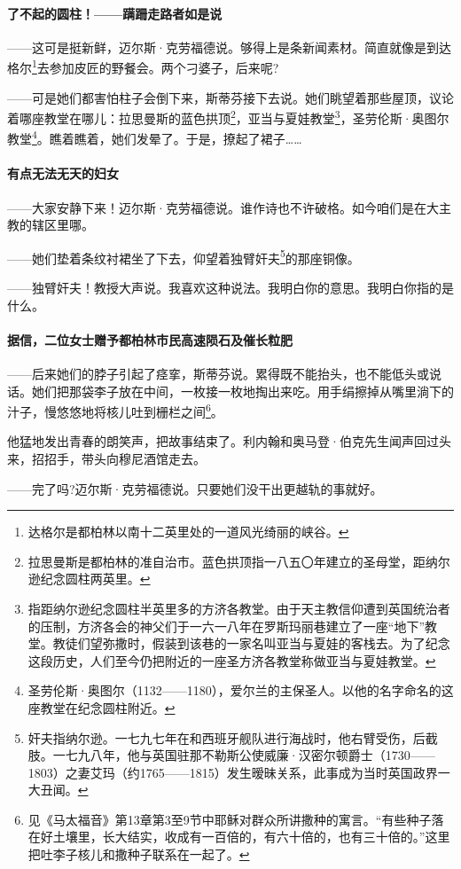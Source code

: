 \paragraph*{了不起的圆柱！——蹒跚走路者如是说}
\par ——这可是挺新鲜，迈尔斯·克劳福德说。够得上是条新闻素材。简直就像是到达格尔\footnote{达格尔是都柏林以南十二英里处的一道风光绮丽的峡谷。}去参加皮匠的野餐会。两个刁婆子，后来呢?
\par ——可是她们都害怕柱子会倒下来，斯蒂芬接下去说。她们眺望着那些屋顶，议论着哪座教堂在哪儿：拉思曼斯的蓝色拱顶\footnote{拉思曼斯是都柏林的准自治市。蓝色拱顶指一八五〇年建立的圣母堂，距纳尔逊纪念圆柱两英里。}，亚当与夏娃教堂\footnote{指距纳尔逊纪念圆柱半英里多的方济各教堂。由于天主教信仰遭到英国统治者的压制，方济各会的神父们于一六一八年在罗斯玛丽巷建立了一座“地下”教堂。教徒们望弥撒时，假装到该巷的一家名叫亚当与夏娃的客栈去。为了纪念这段历史，人们至今仍把附近的一座圣方济各教堂称做亚当与夏娃教堂。}，圣劳伦斯·奥图尔教堂\footnote{圣劳伦斯·奥图尔（1132——1180），爱尔兰的主保圣人。以他的名字命名的这座教堂在纪念圆柱附近。}。瞧着瞧着，她们发晕了。于是，撩起了裙子……
\paragraph*{有点无法无天的妇女}
\par ——大家安静下来！迈尔斯·克劳福德说。谁作诗也不许破格。如今咱们是在大主教的辖区里哪。
\par ——她们垫着条纹衬裙坐了下去，仰望着独臂奸夫\footnote{奸夫指纳尔逊。一七九七年在和西班牙舰队进行海战时，他右臂受伤，后截肢。一七九八年，他与英国驻那不勒斯公使威廉·汉密尔顿爵士（1730——1803）之妻艾玛（约1765——1815）发生暧昧关系，此事成为当时英国政界一大丑闻。}的那座铜像。
\par ——独臂奸夫！教授大声说。我喜欢这种说法。我明白你的意思。我明白你指的是什么。
\paragraph*{据信，二位女士赠予都柏林市民高速陨石及催长粒肥}
\par ——后来她们的脖子引起了痉挛，斯蒂芬说。累得既不能抬头，也不能低头或说话。她们把那袋李子放在中间，一枚接一枚地掏出来吃。用手绢擦掉从嘴里淌下的汁子，慢悠悠地将核儿吐到栅栏之间\footnote{见《马太福音》第13章第3至9节中耶稣对群众所讲撒种的寓言。“有些种子落在好土壤里，长大结实，收成有一百倍的，有六十倍的，也有三十倍的。”这里把吐李子核儿和撒种子联系在一起了。}。
\par 他猛地发出青春的朗笑声，把故事结束了。利内翰和奥马登·伯克先生闻声回过头来，招招手，带头向穆尼酒馆走去。
\par ——完了吗?迈尔斯·克劳福德说。只要她们没干出更越轨的事就好。
